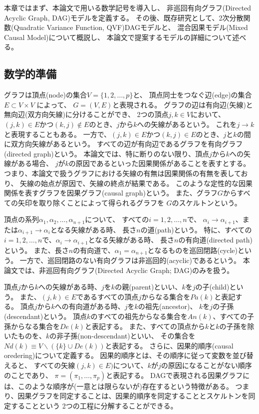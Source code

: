 
本章ではまず、本論文で用いる数学記号を導入し、
非巡回有向グラフ(Directed Acyclic Graph, DAG)モデルを定義する。
その後、既存研究として、2次分散関数(Quadratic Variance Function, QVF)DAGモデル\cite{Park2017-hw}と、
混合因果モデル(Mixed Causal Model)\cite{Wenjuan2018-nm}について概説し、
本論文で提案するモデルの詳細について述べる。

\subsection{数学的準備}

グラフは頂点(node)の集合$V=\{1,2,\dots,p\}$と、
頂点同士をつなぐ辺(edge)の集合$E\subset V \times V$ によって、
$G=(V,E)$と表現される。
グラフの辺は有向辺(矢線)と無向辺(双方向矢線)に分けることができ、
2つの頂点$j,k\in V$において、
$(j,k)\in E$かつ$(k,j)\notin E$のとき、$j$から$k$への矢線があるという。
これを$j \rightarrow k$と表現することもある。
一方で、$(j,k)\in E$かつ$(k,j)\in E$のとき、$j$と$k$の間に双方向矢線があるという。
すべての辺が有向辺であるグラフを有向グラフ(directed graph)という。
本論文では、特に断りのない限り、頂点$j$から$k$への矢線がある場合、
$j$が$k$の原因であるといった因果関係があることを表すとする。
つまり、本論文で扱うグラフにおける矢線の有無は因果関係の有無を表しており、
矢線の始点が原因で、矢線の終点が結果である。
このような定性的な因果関係を表すグラフを因果グラフ(causal graph)という。
また、グラフ$G$からすべての矢印を取り除くことによって得られるグラフを
$G$のスケルトンという。

頂点の系列$\alpha_1, \alpha_2, \dots, \alpha_{n+1}$について、
すべての$i=1,2,\dots, n$で、
$\alpha_i \rightarrow \alpha_{i+1}$、または$\alpha_{i+1} \rightarrow \alpha_i$となる矢線がある時、
長さ$n$の道(path)という。
特に、すべての$i=1,2,\dots, n$で、$\alpha_i \rightarrow \alpha_{i+1}$となる矢線がある時、
長さ$n$の有向道(directed path)という。
また、長さ$n$の有向道で、$\alpha_1 = \alpha_{n+1}$となるものを巡回閉路(cycle)という。
一方で、巡回閉路のない有向グラフは非巡回的(acyclic)であるという。
本論文では、非巡回有向グラフ(Directed Acyclic Graph; DAG)のみを扱う。

頂点$j$から$k$への矢線がある時、$j$を$k$の親(parent)といい、$k$を$j$の子(child)という。
また、$(j,k)\in E$であるすべての頂点$j$からなる集合を$Pa(k)$と表記する。
頂点$j$から$k$への有向道がある時、$j$を$k$の祖先(ancestor)、
$k$を$j$の子孫(descendant)という。
頂点$k$のすべての祖先からなる集合を$An(k)$、すべての子孫からなる集合を$De(k)$と表記する。
また、すべての頂点から$k$と$k$の子孫を除いたものを、$k$の非子孫(non-descendant)といい、
その集合を$Nd(k) \equiv V \backslash (\{k \} \cup De(k))$と表記する。
さらに、因果的順序(causal oredering)について定義する。
因果的順序とは、その順序に従って変数を並び替えると、
すべての矢線$(j,k)\in E)$について、$k$が$j$の原因になることがない順序のことであり、
$\pi =(\pi_1, \dots, \pi_p)$と表記する。
DAGで表現される因果グラフには、このような順序が(一意とは限らないが)存在するという特徴がある。
つまり、因果グラフを同定することは、因果的順序を同定することとスケルトンを同定することという
2つの工程に分解することができる。

